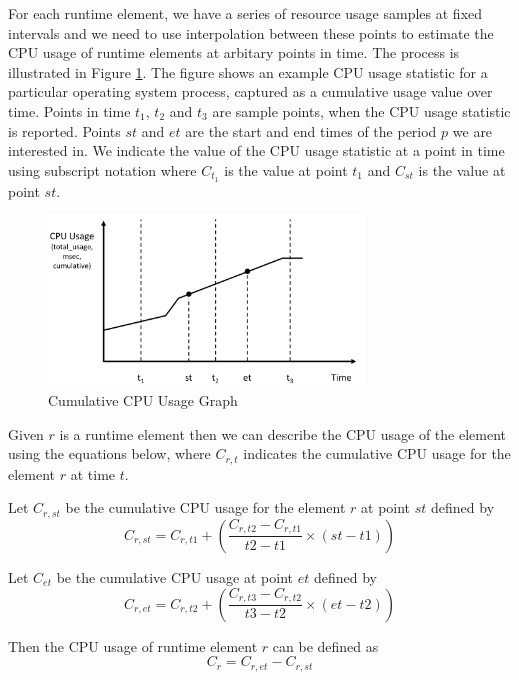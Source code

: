 For each runtime element, we have a series of resource usage samples at fixed intervals and we need to use interpolation between these points to estimate the CPU usage of runtime elements at arbitary points in time. The process is illustrated in Figure \ref{figure:graph}.  The figure shows an example CPU usage statistic for a particular operating system process, captured as a cumulative usage value over time.  Points in time $t_{1}$, $t_{2}$ and $t_{3}$ are sample points, when the CPU usage statistic is reported.  Points $st$ and $et$ are the start and end times of the period $p$ we are interested in.  We indicate the value of the CPU usage statistic at a point in time using subscript notation where $C_{t_{1}}$ is the value at point $t_{1}$ and $C_{st}$ is the value at point $st$.

\begin{figure}
\centering
\includegraphics[width=0.75\textwidth]{Figures/estimating-energy-graph}
\caption{Cumulative CPU Usage Graph}
\label{figure:graph}
\end{figure}

Given $r$ is a runtime element then we can describe the CPU usage of the element using the equations below, where $C_{r,t}$ indicates the cumulative CPU usage for the element $r$ at time $t$.

Let $C_{r, st}$ be the cumulative CPU usage for the element $r$ at point $st$ defined by
\begin{equation}
C_{r,st} = C_{r,t1} + \left( \frac{C_{r,t2} - C_{r,t1}}{t2 - t1} \times (st - t1) \right) 
\end{equation}

Let $C_{et}$ be the cumulative CPU usage at point $et$ defined by
\begin{equation}
C_{r,et} = C_{r,t2} + \left( \frac{C_{r,t3} - C_{r,t2}}{t3 - t2} \times (et - t2) \right) 
\end{equation}

Then the CPU usage of runtime element $r$ can be defined as
\begin{equation}
C_{r} = C_{r,et} - C_{r,st}
\end{equation}

